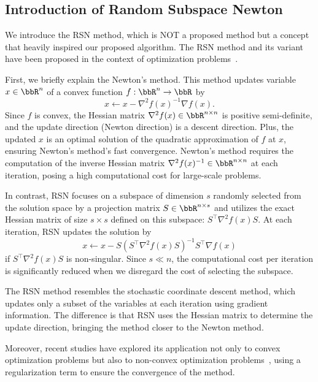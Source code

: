 \documentclass[dvipdfmx,journal]{IEEEtran}
\begin{document}
\subsection{Introduction of Random Subspace Newton}\label{ssec:introRSN}

We introduce the RSN method, which is NOT a proposed method but a concept that heavily inspired our proposed algorithm.
The RSN method and its variant have been proposed in the context of optimization problems~\cite{NEURIPS2019_bc6dc48b,
  fujiRandomizedSubspaceRegularized2022,
  cartisRandomisedSubspaceMethods2022,
  nozawaRandomizedSubspaceGradient2023,
  higuchiFastConvergenceSecondOrder2024}.

First, we briefly explain the Newton's method.
This method updates variable $x \in \bbR^n$ of a convex function $f: \bbR^n \to \bbR$ by
\begin{equation*}
  x \gets x - \nabla^2 f(x)^{-1} \nabla f(x).
\end{equation*}
Since $f$ is convex, the Hessian matrix $\nabla^2 f(x) \in \bbR^{n \times n}$ is positive semi-definite, and the update direction (Newton direction) is a descent direction. Plus, the updated $x$ is an optimal solution of the quadratic approximation of $f$ at $x$, ensuring Newton's method's fast convergence.
Newton's method requires the computation of the inverse Hessian matrix $\nabla^2 f(x)^{-1} \in \bbR^{n \times n}$ at each iteration, posing a high computational cost for large-scale problems.

In contrast, RSN focuses on a subspace of dimension $s$ randomly selected from the solution space by a projection matrix $S \in \bbR^{n \times s}$ and utilizes the exact Hessian matrix of size $s \times s$ defined on this subspace: $S^\top \nabla^2 f(x) S$.
At each iteration, RSN updates the solution by
\begin{equation*}
  x \gets x - S (S^\top \nabla^2 f(x) S)^{-1} S^\top \nabla f(x)
\end{equation*}
if $S^\top \nabla^2 f(x) S$ is non-singular.
Since $s \ll n$, the computational cost per iteration is significantly reduced when we disregard the cost of selecting the subspace.

The RSN method resembles the stochastic coordinate descent method, which updates only a subset of the variables at each iteration using gradient information.
The difference is that RSN uses the Hessian matrix to determine the update direction, bringing the method closer to the Newton method.

Moreover, recent studies have explored its application not only to convex optimization problems but also to non-convex optimization problems~\cite{fujiRandomizedSubspaceRegularized2022}, using a regularization term to ensure the convergence of the method.
\end{document}
